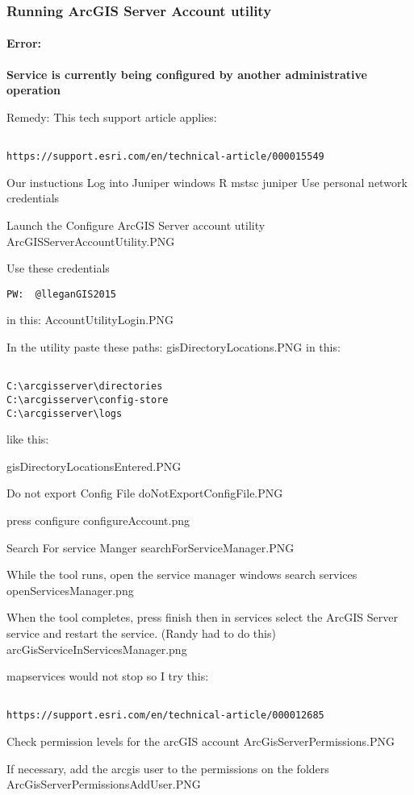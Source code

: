\documentclass[class=book , crop=false, titlepage, twoside, multi={itemize, figure, verbatim}, float=false]{standalone}
\begin{document}
\subsubsection[Running ArcGIS Server Account utility]{Running ArcGIS Server Account utility}

\paragraph*{Error: \texorpdfstring{\\}{}}

\textbf{Service is currently being configured by another administrative operation}


Remedy:
This tech support article applies:

\begin{verbatim}

https://support.esri.com/en/technical-article/000015549

\end{verbatim}

Our instuctions
Log into Juniper
windows R mstsc  juniper
Use personal network credentials


Launch the Configure ArcGIS Server account utility
ArcGISServerAccountUtility.PNG


Use these credentials
\begin{verbatim}
PW:  @lleganGIS2015
\end{verbatim}
in this:
AccountUtilityLogin.PNG


In the utility paste these paths:
gisDirectoryLocations.PNG
in this:


\begin{verbatim}

C:\arcgisserver\directories
C:\arcgisserver\config-store
C:\arcgisserver\logs
\end{verbatim}
like this:

gisDirectoryLocationsEntered.PNG


Do not export Config File
doNotExportConfigFile.PNG


press configure
configureAccount.png


Search For service Manger
searchForServiceManager.PNG


While the tool runs, open the service manager
windows  search services
openServicesManager.png


When the tool completes, press finish
then in services
select the ArcGIS Server service and restart the service.  (Randy had to do this)
arcGisServiceInServicesManager.png


mapservices would not stop so I try this:
\begin{verbatim}

https://support.esri.com/en/technical-article/000012685
\end{verbatim}

Check permission levels for the arcGIS account
ArcGisServerPermissions.PNG


If necessary, add the arcgis user to the permissions on the folders
ArcGisServerPermissionsAddUser.PNG
\end{document}
